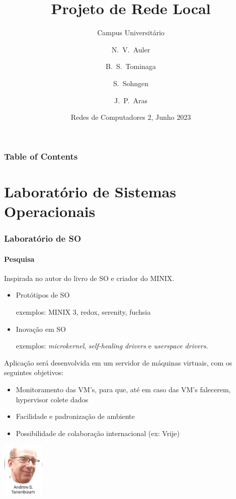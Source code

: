 \documentclass{beamer}
\title[Projeto de Rede Local]
{Projeto de Rede Local}
\subtitle{Campus Universitário}
\author[Auler, Tominaga, Sohngen, Aras] %
{N.~V.~Auler\inst{1} \and B.~S.~Tominaga\inst{1} \and S.~Sohngen\inst{1} \and J.~P.~Aras\inst{1}}
\institute[Poli]
{
  \inst{1}%
  Engenharia de Computação\\
  Poli\--USP 
}
\date[Poli 2023]
{Redes de Computadores 2, Junho 2023}
\begin{document}
\frame{\titlepage}

\begin{frame}
\frametitle{Table of Contents}
\tableofcontents[hideallsubsections]
\end{frame}

\section[]{Laboratório de Sistemas Operacionais}

\begin{frame}
\frametitle{Laboratório de SO}
\framesubtitle{Pesquisa}
Inspirada no autor do livro de SO e criador do MINIX.

\begin{itemize}
    \item Protótipos de SO

        exemplos: MINIX 3, redox, serenity, fuchsia
    \item Inovação em SO

        exemplos: \textit{microkernel}, \textit{self-healing drivers} e \textit{userspace drivers}.
\end{itemize}

Aplicação será desenvolvida em um servidor de máquinas virtuais, com os seguintes objetivos:

\begin{itemize}
    \item Monitoramento das VM's, para que, até em caso das VM's falecerem, hypervisor colete dados
    \item Facilidade e padronização de ambiente
    \item Possibilidade de colaboração internacional (ex: Vrije)
\end{itemize}

\includegraphics[width=0.15\textwidth]{tanem.jpg}
\end{frame}
\end{document}
